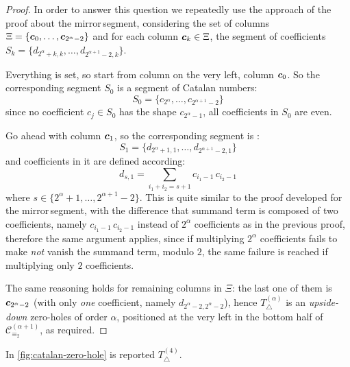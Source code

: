 \begin{proof}
In order to answer this question we repeatedly use the approach
of the proof about the \flqq mirror\frqq\,segment, considering the set of columns 
$\Xi=\lbrace \boldsymbol{c}_{0},\ldots, \boldsymbol{c}_{2^{{\alpha}}-2}\rbrace$ and
for each column $\boldsymbol{c}_{k}\in\Xi$, the segment of coefficients
    $S_{k}=\lbrace d_{2^{{\alpha}}+k,k},\ldots,d_{2^{{\alpha}+1}-2,k} \rbrace$.

Everything is set, so start from column on the very left, column $\boldsymbol{c}_{0}$.
So the corresponding segment $S_{0}$ is
a segment of Catalan numbers:
\begin{displaymath}
 S_{0}=\lbrace c_{2^{{\alpha}}}, \ldots, c_{2^{{\alpha}+1}-2}\rbrace
\end{displaymath}
since no coefficient $c_{j}\in S_{0}$ has the shape $c_{2^{\alpha}-1}$, 
all coefficients in $S_{0}$ are even.

Go ahead with column $\boldsymbol{c}_{1}$, so the corresponding segment is :
\begin{displaymath}
    S_{1}=\lbrace d_{2^{{\alpha}}+1,1},\ldots,d_{2^{{\alpha}+1}-2,1} \rbrace
\end{displaymath}
and coefficients in it are defined according:
\begin{displaymath}
    d_{s, 1} = \sum_{i_{1}+i_{2}=s+1} {c_{i_{1}-1}\,c_{i_{2}-1}}
\end{displaymath}
where $s\in \lbrace2^{{\alpha}}+1,\ldots,2^{{\alpha}+1}-2\rbrace$. 
This is quite similar to the proof developed for the \flqq mirror\frqq\,segment,
with the difference that summand term is composed of two coefficients, namely
$c_{i_{1}-1}\,c_{i_{2}-1}$ instead of $2^{{\alpha}}$ coefficients as in the previous proof, 
therefore the same argument applies,
since if multiplying $2^{{\alpha}}$ coefficients fails to make \emph{not} vanish
the summand term, modulo $2$, the same failure is reached if multiplying only $2$ coefficients.

The same reasoning holds for remaining columns in $\Xi$: the last one of them is 
$\boldsymbol{c}_{2^{\alpha}-2}$ (with only \emph{one} coefficient, namely $d_{2^{\alpha}-2,2^{\alpha}-2}$), 
hence $T_{\bigtriangleup}^{({\alpha})}$ is an \emph{upside-down} zero-holes of order $\alpha$,
positioned at the very left in the bottom half of $\mathcal{C}_{\equiv_{2}}^{(\alpha+1)}$, as required.

\end{proof}


In \autoref{fig:catalan-zero-hole} is reported $T_{\bigtriangleup}^{(4)}$.

